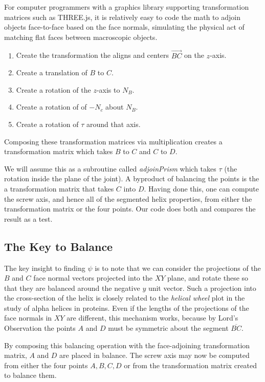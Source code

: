 \documentclass[11pt]{article}
\begin{document}
{For computer programmers with a graphics library supporting transformation matrices such
as THREE.js\cite{dirksen2013learning},
it is relatively easy to code the math to adjoin objects
face-to-face based on the face normals, simulating the physical act of
matching flat faces between macroscopic objects.
\begin{enumerate}
  \item Create the transformation the aligns and centers $\overrightarrow{BC}$ on the $z$-axis.
\item Create a translation of $B$ to $C$.
\item Create a rotation of the $z$-axis to  $N_B$.
\item Create a rotation of of $-N_c$ about $N_B$.
  \item Create a rotation of $\tau$ around that axis.
\end{enumerate}
Composing these transformation matrices via multiplication creates a
transformation matrix which takes $B$ to $C$ and $C$ to $D$.

We will assume this
as a subroutine called {\em adjoinPrism} which takes $\tau$
(the rotation inside the plane of the joint). A byproduct
of balancing the points is the a transformation matrix
that takes $C$ into $D$. Having done this, one can compute
the screw axis, and hence all of the segmented helix properties,
from either the transformation matrix or the four points. Our
code does both and compares the result as a test.

\subsection{The Key to Balance}

The key insight to finding $\psi$ is to note that we
can consider the projections of the $B$ and $C$ face normal vectors
projected into the $XY$ plane, and rotate these so that they
are balanced around the negative $y$ unit vector.
Such a projection into the cross-section of the helix is closely related to
the {\em helical wheel}\cite{wiki:helicalwheel} plot
in the study of alpha helices in proteins.
Even if the lengths of the projections of the face normals in $XY$
are different, this mechanism works, because by Lord's Observation
the points $A$ and $D$ must be symmetric about the segment $\overline{BC}$.

By composing this balancing operation with the face-adjoining transformation
matrix, $A$ and $D$ are placed in balance. The screw axis may now
be computed from either the four points $A,B,C,D$ or from the transformation
matrix created to balance them.

}
\end{document}
